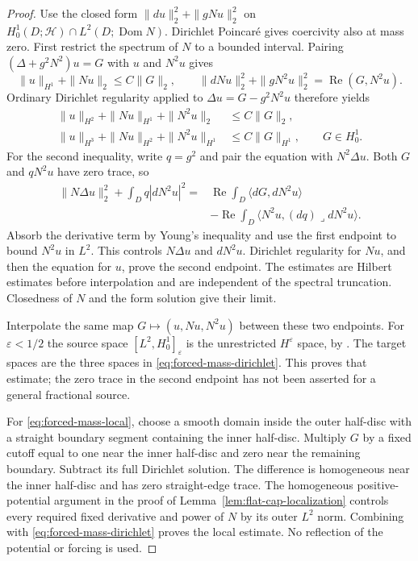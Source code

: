 \documentclass[11pt]{amsart}
\theoremstyle{definition}
\theoremstyle{remark}
\theoremstyle{plain}
\begin{document}
\begin{proof}
Use the closed form
$\|du\|_2^2+\|gNu\|_2^2$ on
$H^1_0(D;\mathcal H)\cap L^2(D;\operatorname{Dom}N)$.
Dirichlet Poincar\'e gives coercivity also at mass zero.
First restrict the spectrum of $N$ to a bounded interval.
Pairing $(\Delta+g^2N^2)u=G$ with $u$ and $N^2u$ gives
\[
 \|u\|_{H^1}+\|Nu\|_2\leq C\|G\|_2,\qquad
 \|dNu\|_2^2+\|gN^2u\|_2^2=\operatorname{Re}(G,N^2u).
\]
Ordinary Dirichlet regularity applied to
$\Delta u=G-g^2N^2u$ therefore yields
\begin{equation}\label{eq:forced-mass-endpoints}
\begin{aligned}
 \|u\|_{H^2}+\|Nu\|_{H^1}+\|N^2u\|_2
                                      &\leq C\|G\|_2,\\
 \|u\|_{H^3}+\|Nu\|_{H^2}+\|N^2u\|_{H^1}
                                      &\leq C\|G\|_{H^1},
                    \qquad G\in H^1_0.
\end{aligned}
\end{equation}
For the second inequality, write $q=g^2$ and pair the equation
with $N^2\Delta u$. Both $G$ and $qN^2u$ have zero trace, so
\begin{equation}\label{eq:forced-mass-energy}
\begin{aligned}
 \|N\Delta u\|_2^2+\int_Dq|dN^2u|^2
 ={}&\operatorname{Re}\int_D\langle dG,dN^2u\rangle\\
 &-\operatorname{Re}\int_D
       \langle N^2u,(dq)\mathbin{\lrcorner}dN^2u\rangle .
\end{aligned}
\end{equation}
Absorb the derivative term by Young's inequality and use the first
endpoint to bound $N^2u$ in $L^2$. This controls $N\Delta u$
and $dN^2u$. Dirichlet regularity for $Nu$, and then the equation
for $u$, prove the second endpoint. The estimates are Hilbert
estimates before interpolation and are independent of the spectral
truncation. Closedness of $N$ and the form solution give their limit.

Interpolate the same map $G\mapsto(u,Nu,N^2u)$ between these
two endpoints. For $\varepsilon<1/2$ the source space
$[L^2,H^1_0]_\varepsilon$ is the unrestricted $H^\varepsilon$
space, by \cite[Definition~2.1 and Theorem~2.2]{Grubb16}.
The target spaces are the three spaces in
\eqref{eq:forced-mass-dirichlet}. This proves that estimate;
the zero trace in the second endpoint has not been asserted
for a general fractional source.

For \eqref{eq:forced-mass-local}, choose a smooth domain inside
the outer half-disc with a straight boundary segment containing
the inner half-disc. Multiply $G$ by a fixed cutoff equal to one
near the inner half-disc and zero near the remaining boundary.
Subtract its full Dirichlet solution. The difference is homogeneous
near the inner half-disc and has zero straight-edge trace.
The homogeneous positive-potential argument in the proof of
Lemma~\ref{lem:flat-cap-localization} controls every required
fixed derivative and power of $N$ by its outer $L^2$ norm.
Combining with \eqref{eq:forced-mass-dirichlet} proves the local
estimate. No reflection of the potential or forcing is used.
\end{proof}
\end{document}
